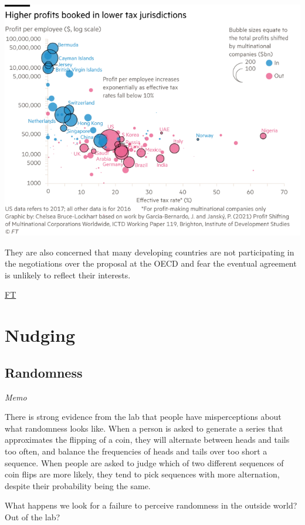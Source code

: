 \documentclass[
]{book}
\begin{document}
\includegraphics{fig/ft_tax_shifting.png}

They are also concerned that many developing countries are not participating in the negotiations over the proposal at the OECD and fear the eventual agreement is unlikely to reflect their interests.

\href{https://www.ft.com/content/9f8304c5-5aad-4064-9218-54070981fb4d}{FT}

\hypertarget{nudging}{%
\chapter{Nudging}\label{nudging}}

\hypertarget{randomness}{%
\section{Randomness}\label{randomness}}

\emph{Memo}

There is strong evidence from the lab that people have misperceptions about what randomness looks like. When a person is asked to generate a series that approximates the flipping of a coin, they will alternate between heads and tails too often, and balance the frequencies of heads and tails over too short a sequence. When people are asked to judge which of two different sequences of coin flips are more likely, they tend to pick sequences with more alternation, despite their probability being the same.

What happens we look for a failure to perceive randomness in the outside world? Out of the lab?
\end{document}
